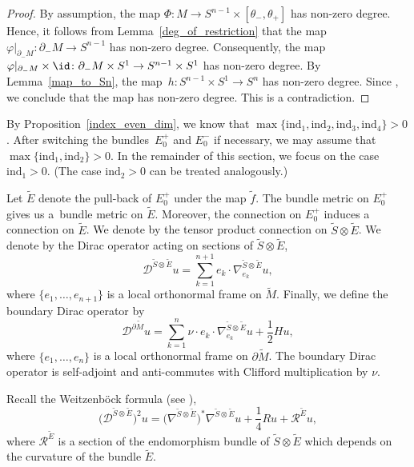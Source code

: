\begin{proof}
By assumption, the map $\Phi\colon M \to S^{n-1} \times [\theta_-,\theta_+]$ has non-zero degree.
Hence, it follows from Lemma~\ref{deg_of_restriction} that the map $\varphi|_{\partial_- M}\colon \partial_- M \to S^{n-1}$ has non-zero degree.
Consequently, the map $\varphi|_{\partial_- M} \times \id\colon \partial_- M \times S^1 \to S^{n-1} \times S^1$ has non-zero degree. By Lemma~\ref{map_to_Sn}, the map~${h\colon S^{n-1} \times S^1 \to S^n}$ has non-zero degree.
Since , we conclude that the map  has non-zero degree.
This is a contradiction.
\end{proof}

By Proposition~\ref{index_even_dim}, we know that $\max \{\mathrm{ind}_1,\mathrm{ind}_2, \mathrm{ind}_3, \mathrm{ind}_4\} > 0$. After switching the bundles~$E_0^+$ and $E_0^-$ if necessary, we may assume that $\max \{\mathrm{ind}_1,\mathrm{ind}_2\} > 0$.
In the remainder of this section, we focus on the case $\mathrm{ind}_1 > 0$.
(The case $\mathrm{ind}_2 > 0$ can be treated analogously.)

Let $\tilde{E}$ denote the pull-back of $E_0^+$ under the map $\tilde{f}$. The bundle metric on $E_0^+$ gives us a~bundle metric on $\tilde{E}$. Moreover, the connection on $E_0^+$ induces a connection on $\tilde{E}$. We denote by  the tensor product connection on $\tilde{S} \otimes \tilde{E}$. We denote by  the Dirac operator acting on sections of $\tilde{S} \otimes \tilde{E}$,
\[
 \mathcal{D}^{\tilde{S} \otimes \tilde{E}} u = \sum_{k=1}^{n+1} e_k \cdot \nabla_{e_k}^{\tilde{S} \otimes \tilde{E}} u,
\]
where $\{e_1, \ldots, e_{n+1}\}$ is a local orthonormal frame on $\tilde{M}$.
Finally, we define the boundary Dirac operator by
\[
 \mathcal{D}^{\partial \tilde{M}} u = \sum_{k=1}^n \nu \cdot e_k \cdot \nabla_{e_k}^{\tilde{S} \otimes \tilde{E}} u + \frac{1}{2} H u,
\]
where $\{e_1,\hdots,e_n\}$ is a local orthonormal frame on $\partial \tilde{M}$.
The boundary Dirac operator is self-adjoint and anti-commutes with Clifford multiplication by $\nu$.

Recall the Weitzenb\"ock formula (see \cite[Theorem~8.17, Chapter~II]{Lawson-Michelsohn}),
\[
 \big(\mathcal{D}^{\tilde{S} \otimes \tilde{E}}\big)^2 u
 =
 \big(\nabla^{\tilde{S} \otimes \tilde{E}}\big)^*\nabla^{\tilde{S} \otimes \tilde{E}} u + \frac{1}{4} R u + \mathcal{R}^{\tilde{E}} u,
\]
where $\mathcal{R}^{\tilde{E}}$ is a section of the endomorphism bundle of $\tilde{S} \otimes \tilde{E}$ which depends on the curvature of the bundle $\tilde{E}$.

